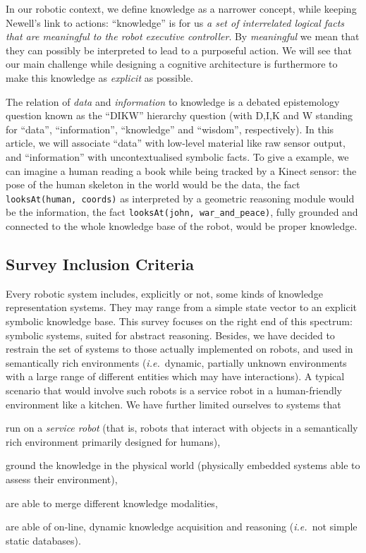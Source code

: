 \documentclass[journal]{IEEEtran}
\newcommand{\ie}{{\textit{i.e.\ }}}
\newcommand{\concept}[1]{{\footnotesize \texttt{#1}}}
\begin{document}
In our robotic context, we define knowledge as a narrower concept, while
keeping Newell's link to actions: ``knowledge'' is for us  \emph{a set of
interrelated logical facts that are meaningful to the robot executive
controller}. By \emph{meaningful} we mean that they can possibly be interpreted 
to lead to a purposeful action. We will see that our main challenge while
designing a cognitive architecture is furthermore to make this knowledge as
\emph{explicit} as possible.

The relation of \emph{data} and \emph{information} to knowledge is a debated
epistemology question known as the ``DIKW'' hierarchy question (with D,I,K 
and W standing for ``data'', ``information'', ``knowledge'' and ``wisdom'', 
respectively). In this article, we will associate ``data'' with low-level 
material like raw sensor output, and ``information'' with uncontextualised 
symbolic facts.
To give a example, we can imagine a human reading a book while being tracked by
a Kinect sensor: the pose of the human skeleton in the world would be the data,
the fact \concept{looksAt(human, coords)} as interpreted by a geometric reasoning
module would be the information, the fact \concept{looksAt(john,
war\_and\_peace)}, fully grounded and connected to the whole knowledge base of
the robot, would be proper knowledge.


\subsection*{Survey Inclusion Criteria}
\label{sect|inclusion-criteria}

Every robotic system includes, explicitly or not, some kinds of knowledge 
representation systems. They may range from a simple state vector to an 
explicit symbolic knowledge base. This survey focuses on the right end of 
this spectrum: symbolic systems, suited for abstract reasoning.
% 
Besides, we have decided to restrain the set of systems to those actually
implemented on robots, and used in semantically rich environments (\ie dynamic,
partially unknown environments with a large range of different entities which
may have interactions). A typical scenario that would involve such robots is
a service robot in a human-friendly environment like a kitchen.
% 
We have further limited ourselves to systems that
\begin{inparaenum} 
  \item  run on a \emph{service robot} (that is, robots that interact with 
  objects in a semantically rich environment primarily designed for humans),
  \item  ground the knowledge in the physical world (physically embedded
  systems able to assess their environment),
  \item  are able to merge different knowledge modalities,
  \item  are able of on-line, dynamic knowledge acquisition and reasoning 
  (\ie not simple static databases).
\end{inparaenum}
\end{document}
